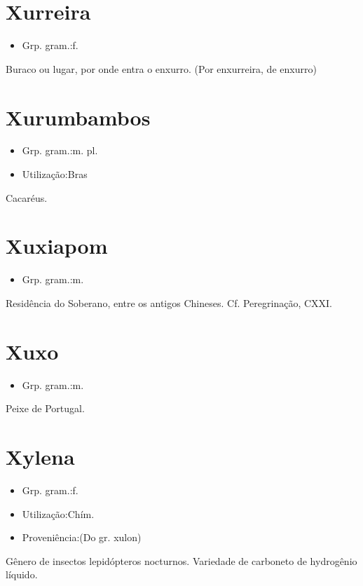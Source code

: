 \section{Xurreira}
\begin{itemize}
\item {Grp. gram.:f.}
\end{itemize}
Buraco ou lugar, por onde entra o enxurro.
(Por \textunderscore enxurreira\textunderscore , de \textunderscore enxurro\textunderscore )
\section{Xurumbambos}
\begin{itemize}
\item {Grp. gram.:m. pl.}
\end{itemize}
\begin{itemize}
\item {Utilização:Bras}
\end{itemize}
Cacaréus.
\section{Xuxiapom}
\begin{itemize}
\item {Grp. gram.:m.}
\end{itemize}
Residência do Soberano, entre os antigos Chineses. Cf. \textunderscore Peregrinação\textunderscore , CXXI.
\section{Xuxo}
\begin{itemize}
\item {Grp. gram.:m.}
\end{itemize}
Peixe de Portugal.
\section{Xylena}
\begin{itemize}
\item {Grp. gram.:f.}
\end{itemize}
\begin{itemize}
\item {Utilização:Chím.}
\end{itemize}
\begin{itemize}
\item {Proveniência:(Do gr. \textunderscore xulon\textunderscore )}
\end{itemize}
Gênero de insectos lepidópteros nocturnos.
Variedade de carboneto de hydrogênio líquido.
